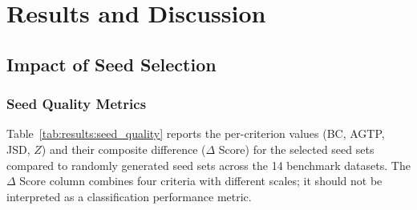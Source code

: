 
\chapter{Results and Discussion}
\label{ch:results}


\section{Impact of Seed Selection}
\label{sec:results:seed_impact}

\subsection{Seed Quality Metrics}

Table~\ref{tab:results:seed_quality} reports the per-criterion values (BC, AGTP, JSD, $Z$) and their composite difference ($\Delta$ Score) for the selected seed sets compared to randomly generated seed sets across the 14 benchmark datasets.
The $\Delta$ Score column combines four criteria with different scales; it should not be interpreted as a classification performance metric.

